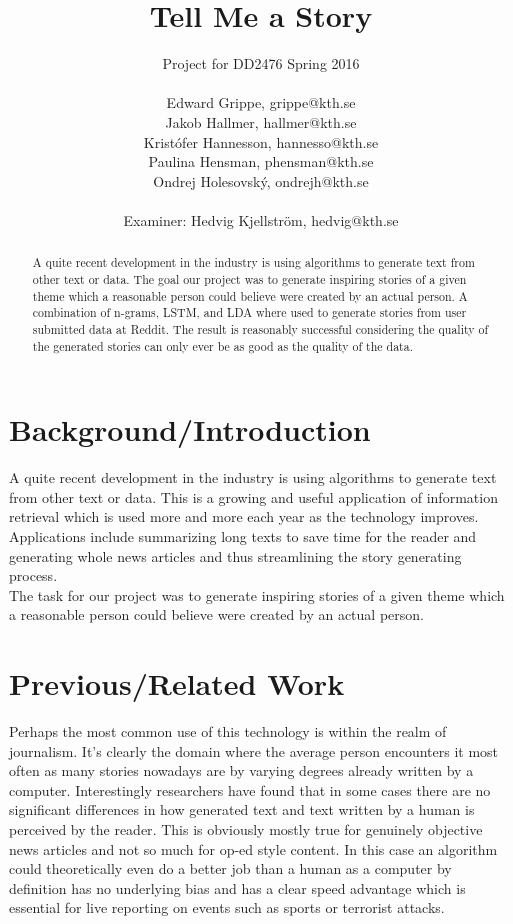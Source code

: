 \documentclass[12pt,a4paper,utf8]{article}
\title{Tell Me a Story}
\author{Project for DD2476 Spring 2016\\\\Edward Grippe, grippe@kth.se\\Jakob Hallmer, hallmer@kth.se\\Kristófer Hannesson, hannesso@kth.se\\Paulina Hensman, phensman@kth.se\\Ondrej Holesovský, ondrejh@kth.se\\\\ Examiner: Hedvig Kjellström, hedvig@kth.se}
\begin{document}
\maketitle
\thispagestyle{empty}
\clearpage


\begin{abstract}
A quite recent development in the industry is using algorithms to generate text from other text or data. The goal our project was to generate inspiring stories of a given theme which a reasonable person could believe were created by an actual person. A combination of n-grams, LSTM, and LDA where used to generate stories from user submitted data at Reddit. The result is reasonably successful considering the quality of the generated stories can only ever be as good as the quality of the data.
\end{abstract}
\pagebreak


\pagestyle{plain}
\tableofcontents
\cleardoublepage
\pagebreak




\setcounter{page}{1}
\setcounter{secnumdepth}{3}

\section{Background/Introduction}
A quite recent development in the industry is using algorithms to generate text from other text or data. This is a growing and useful application of information retrieval which is used more and more each year as the technology improves. Applications include summarizing long texts to save time for the reader and generating whole news articles and thus streamlining the story generating process\autocite{RobotJournalist}.\\

The task for our project was to generate inspiring stories of a given theme which a reasonable person could believe were created by an actual person.

\section{Previous/Related Work}
Perhaps the most common use of this technology is within the realm of journalism. It's clearly the domain where the average person encounters it most often as many stories nowadays are by varying degrees already written by a computer. Interestingly researchers have found that in some cases there are no significant differences in how generated text and text written by a human is perceived by the reader\autocite{RobotJournalist}. This is obviously mostly true for genuinely objective news articles and not so much for op-ed style content. In this case an algorithm could theoretically even do a better job than a human as a computer by definition has no underlying bias and has a clear speed advantage which is essential for live reporting on events such as sports or terrorist attacks.\\
\end{document}
